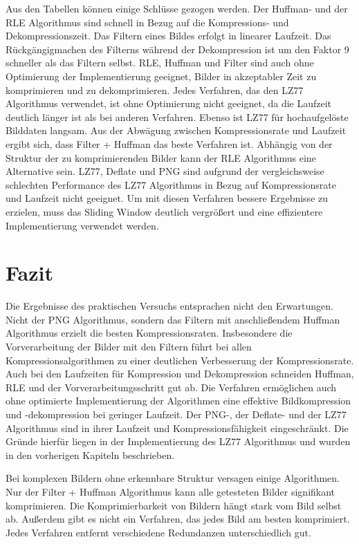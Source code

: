 \documentclass[conference]{IEEEtran}
\begin{document}
Aus den Tabellen können einige Schlüsse gezogen werden.
Der Huffman- und der RLE Algorithmus sind schnell in Bezug auf die
Kompressions- und Dekompressionszeit.
Das Filtern eines Bildes erfolgt in linearer Laufzeit.
Das Rückgängigmachen des Filterns während der Dekompression ist um
den Faktor 9 schneller als das Filtern selbst.
RLE, Huffman und Filter sind auch ohne Optimierung der Implementierung
geeignet, Bilder in akzeptabler Zeit zu komprimieren und zu dekomprimieren.
Jedes Verfahren, das den LZ77 Algorithmus verwendet, ist ohne Optimierung
nicht geeignet, da die Laufzeit deutlich länger ist als bei anderen Verfahren.
Ebenso ist LZ77 für hochaufgelöste Bilddaten langsam.
Aus der Abwägung zwischen Kompressionsrate und Laufzeit ergibt sich, dass
Filter + Huffman das beste Verfahren ist.
Abhängig von der Struktur der zu komprimierenden Bilder kann der RLE
Algorithmus eine Alternative sein.
LZ77, Deflate und PNG sind aufgrund der vergleichsweise schlechten Performance
des LZ77 Algorithmus in Bezug auf Kompressionsrate und Laufzeit nicht geeignet.
Um mit diesen Verfahren bessere Ergebnisse zu erzielen, muss das Sliding Window
deutlich vergrößert und eine effizientere Implementierung verwendet werden.


\section{Fazit}

Die Ergebnisse des praktischen Versuchs entsprachen nicht den Erwartungen.
Nicht der PNG Algorithmus, sondern das Filtern mit anschließendem
Huffman Algorithmus erzielt die besten Kompressionsraten.
Insbesondere die Vorverarbeitung der Bilder mit den Filtern führt
bei allen Kompressionsalgorithmen zu einer deutlichen Verbesserung
der Kompressionsrate.
Auch bei den Laufzeiten für Kompression und Dekompression schneiden
Huffman, RLE und der Vorverarbeitungsschritt gut ab.
Die Verfahren ermöglichen auch ohne optimierte Implementierung der
Algorithmen eine effektive Bildkompression und -dekompression bei
geringer Laufzeit.
Der PNG-, der Deflate- und der LZ77 Algorithmus sind in ihrer Laufzeit und
Kompressionsfähigkeit eingeschränkt.
Die Gründe hierfür liegen in der Implementierung des LZ77 Algorithmus und
wurden in den vorherigen Kapiteln beschrieben.

Bei komplexen Bildern ohne erkennbare Struktur versagen einige Algorithmen.
Nur der Filter + Huffman Algorithmus kann alle getesteten Bilder signifikant
komprimieren.
Die Komprimierbarkeit von Bildern hängt stark vom Bild selbst ab.
Außerdem gibt es nicht ein Verfahren, das jedes Bild am besten komprimiert.
Jedes Verfahren entfernt verschiedene Redundanzen unterschiedlich gut.



\end{document}
